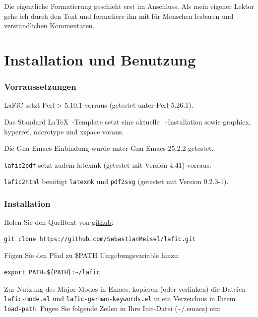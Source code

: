 \documentclass{scrartcl}
\begin{document}
{Die eigentliche Formatierung geschieht erst im
Anschluss. Als mein eigener Lektor gehe ich durch den Text
und formatiere ihn mit für Menschen lesbaren und
verständlichen Kommentaren.\\}

\part{Installation und Benutzung}

\section{Vorraussetzungen}

{LaFiC setzt Perl > 5.10.1 vorraus (getestet unter Perl 5.26.1).\\}

{Das Standard \LaTeX\ -Template setzt eine aktuelle
\XeLaTeX\ -Installation sowie graphicx, hyperref, microtype und
xspace voraus.\\}

{Die Gnu-Emacs-Einbindung wurde unter Gnu Emacs 25.2.2 getestet.\\}

{\texttt{lafic2pdf} setzt zudem latexmk (getestet mit Version 4.41) vorraus.\\}

{\texttt{lafic2html} benötigt \texttt{latexmk} und \texttt{pdf2svg} (getestet mit
Version 0.2.3-1).\\}

\section{Installation}
\label{Installation}

{Holen Sie den Quelltext von \href{https://github.com/SebastianMeisel/lafic}{github}:\\}

\begin{verbatim}
git clone https://github.com/SebastianMeisel/lafic.git
\end{verbatim}


{Fügen Sie den Pfad zu \$PATH Umgebungsvariable hinzu:\\}

\begin{verbatim}
export PATH=${PATH}:~/lafic
\end{verbatim}


{Zur Nutzung des Major Modes in Emacs, kopieren (oder
verlinken) die Dateien \texttt{lafic-mode.el} und
\texttt{lafic-german-keywords.el} in ein Verzeichnis in Ihrem
\texttt{load-path}. Fügen Sie folgende Zeilen in Ihre Init-Datei
(\textasciitilde /.emacs) ein:\\}
\end{document}
